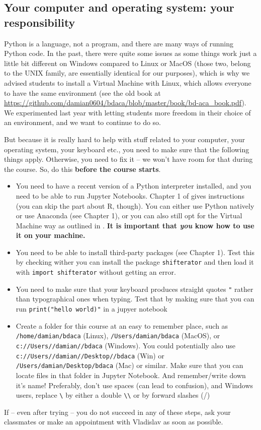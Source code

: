 \documentclass[a4paper,10pt,twocolumn]{report}
\newenvironment{corona}{%
	\begin{shaded*}%
	}{%
	\end{shaded*}%
}
\begin{document}
\begin{corona}
\section{Your computer and operating system: your responsibility}	
Python is a language, not a program, and there are many ways of running Python code. In the past, there were quite some issues as some things work just a little bit different on Windows compared to Linux or MacOS (those two, belong to the UNIX family, are essentially identical for our purposes), which is why we advised students to install a Virtual Machine with Linux, which allows everyone to have the same environment (see the old book at \url{https://github.com/damian0604/bdaca/blob/master/book/bd-aca_book.pdf}). We experimented last year with letting students more freedom in their choice of an environment, and we want to continue to do so.

But because it is really hard to help with stuff related to your computer, your operating system, your keyboard etc., you need to make sure that the following things apply. Otherwise, you need to fix it -- we won't have room for that during the course. So, do this \textbf{before the course starts}.

\begin{itemize}
	\item You need to have a recent version of a Python interpreter installed, and you need to be able to run Jupyter Notebooks. Chapter 1 of \cite{cssbook} gives instructions (you can skip the part about R, though). You can either use Python natively or use Anaconda (see Chapter 1), or you can also still opt for the Virtual Machine way as outlined in \cite{Trilling2016}. \textbf{It is important that \emph{you} know how to use it on your machine.}
	\item You need to be able to install third-party packages (see Chapter 1). Test this by checking wither you can install the package \texttt{shifterator} and then load it with \texttt{import shifterator} without getting an error.
	\item You need to make sure that your keyboard produces straight quotes \texttt{"} rather than typographical ones when typing. Test that by making sure that you can run \texttt{print("hello world)"} in a jupyer notebook
	\item Create a folder for this course at an easy to remember place, such as \texttt{/home/damian/bdaca} (Linux), \texttt{/Users/damian/bdaca} (MacOS), or \texttt{c://Users//damian//bdaca} (Windows). You could potentially also use \texttt{c://Users//damian//Desktop//bdaca} (Win) or \texttt{/Users/damian/Desktop/bdaca} (Mac) or similar. Make sure that you can locate files in that folder in Jupyter Notebook. And remember/write down it's name! Preferably, don't use spaces (can lead to confusion), and Windows users, replace \texttt{\textbackslash} by either a double \texttt{\textbackslash \textbackslash} or by forward slashes (/)
\end{itemize}
If -- even after trying -- you do not succeed in any of these steps, ask your classmates or make an appointment with Vladislav as soon as possible.



\end{corona}
\end{document}
